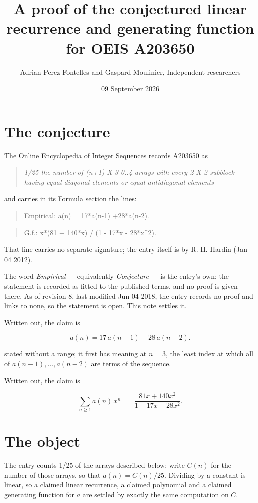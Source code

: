 \documentclass[11pt]{article}
\title{A proof of the conjectured linear recurrence and generating function for OEIS A203650}
\author{Adrian Perez Fontelles and Gaspard Moulinier, Independent researchers}
\date{09 September 2026}
\theoremstyle{definition}
\begin{document}
\maketitle
\section{The conjecture}

The Online Encyclopedia of Integer Sequences records \href{https://oeis.org/A203650}{A203650} as

\begin{quote}\itshape 1/25 the number of (n+1) X 3 0..4 arrays with every 2 X 2 subblock having equal diagonal elements or equal antidiagonal elements\end{quote}

and carries in its Formula section the lines:

\begin{quote}\ttfamily Empirical: a(n) = 17*a(n-1) +28*a(n-2).\end{quote}

\begin{quote}\ttfamily G.f.: x*(81 + 140*x) / (1 - 17*x - 28*x\textasciicircum{}2).\end{quote}

That line carries no separate signature; the entry itself is by R. H. Hardin (Jan 04 2012).

The word {\itshape Empirical} --- equivalently {\itshape Conjecture} --- is the entry's own: the statement is recorded as fitted to the published terms, and no proof is given there. As of revision 8, last modified Jun 04 2018, the entry records no proof and links to none, so the statement is open. This note settles it.

Written out, the claim is

\[a(n) = 17\,a(n-1) + 28\,a(n-2).\]

stated without a range; it first has meaning at $n = 3$, the least index at which all of $a(n-1),\dots,a(n-2)$ are terms of the sequence.

Written out, the claim is

\[\sum_{n \ge 1} a(n)\,x^n \;=\; \frac{81x + 140x^{2}}{1 - 17x - 28x^{2}}.\]

\section{The object}

The entry counts 1/25 of the arrays described below; write $C(n)$ for the number of those arrays, so that $a(n) = C(n)/25$. Dividing by a constant is linear, so a claimed linear recurrence, a claimed polynomial and a claimed generating function for $a$ are settled by exactly the same computation on $C$.
\end{document}
